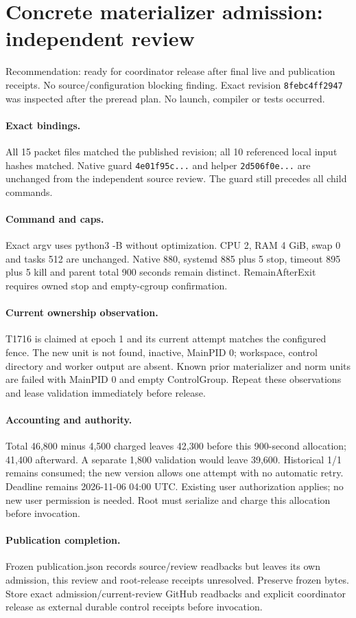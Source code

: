 \documentclass[10pt]{article}
\begin{document}
\section*{Concrete materializer admission: independent review}
Recommendation: ready for coordinator release after final live and publication receipts. No source/configuration blocking finding. Exact revision \texttt{8febc4ff2947} was inspected after the preread plan. No launch, compiler or tests occurred.
\paragraph{Exact bindings.} All 15 packet files matched the published revision; all 10 referenced local input hashes matched. Native guard \texttt{4e01f95c...} and helper \texttt{2d506f0e...} are unchanged from the independent source review. The guard still precedes all child commands.
\paragraph{Command and caps.} Exact argv uses python3 -B without optimization. CPU 2, RAM 4 GiB, swap 0 and tasks 512 are unchanged. Native 880, systemd 885 plus 5 stop, timeout 895 plus 5 kill and parent total 900 seconds remain distinct. RemainAfterExit requires owned stop and empty-cgroup confirmation.
\paragraph{Current ownership observation.} T1716 is claimed at epoch 1 and its current attempt matches the configured fence. The new unit is not found, inactive, MainPID 0; workspace, control directory and worker output are absent. Known prior materializer and norm units are failed with MainPID 0 and empty ControlGroup. Repeat these observations and lease validation immediately before release.
\paragraph{Accounting and authority.} Total 46,800 minus 4,500 charged leaves 42,300 before this 900-second allocation; 41,400 afterward. A separate 1,800 validation would leave 39,600. Historical 1/1 remains consumed; the new version allows one attempt with no automatic retry. Deadline remains 2026-11-06 04:00 UTC. Existing user authorization applies; no new user permission is needed. Root must serialize and charge this allocation before invocation.
\paragraph{Publication completion.} Frozen publication.json records source/review readbacks but leaves its own admission, this review and root-release receipts unresolved. Preserve frozen bytes. Store exact admission/current-review GitHub readbacks and explicit coordinator release as external durable control receipts before invocation.
\end{document}

